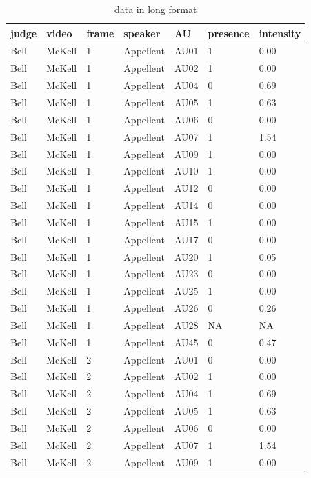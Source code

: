 \documentclass{monashthesis}
\begin{document}
\begin{table}[ht]
\begin{center}
\caption{\label{tab:long} data in long format}
\begin{tabular}{lllllll}
\toprule
judge & video & frame & speaker & AU & presence & intensity \\
\midrule
Bell & McKell & 1 & Appellent & AU01 &  1 & 0.00 \\
Bell & McKell & 1 & Appellent & AU02 &  1 & 0.00 \\
Bell & McKell & 1 & Appellent & AU04 &  0 & 0.69 \\
Bell & McKell & 1 & Appellent & AU05 &  1 & 0.63 \\
Bell & McKell & 1 & Appellent & AU06 &  0 & 0.00 \\
Bell & McKell & 1 & Appellent & AU07 &  1 & 1.54 \\
Bell & McKell & 1 & Appellent & AU09 &  1 & 0.00 \\
Bell & McKell & 1 & Appellent & AU10 &  1 & 0.00 \\
Bell & McKell & 1 & Appellent & AU12 &  0 & 0.00 \\
Bell & McKell & 1 & Appellent & AU14 &  0 & 0.00 \\
Bell & McKell & 1 & Appellent & AU15 &  1 & 0.00 \\
Bell & McKell & 1 & Appellent & AU17 &  0 & 0.00 \\
Bell & McKell & 1 & Appellent & AU20 &  1 & 0.05 \\
Bell & McKell & 1 & Appellent & AU23 &  0 & 0.00 \\
Bell & McKell & 1 & Appellent & AU25 &  1 & 0.00 \\
Bell & McKell & 1 & Appellent & AU26 &  0 & 0.26 \\
Bell & McKell & 1 & Appellent & AU28 & NA &   NA \\
Bell & McKell & 1 & Appellent & AU45 &  0 & 0.47 \\
Bell & McKell & 2 & Appellent & AU01 &  0 & 0.00 \\
Bell & McKell & 2 & Appellent & AU02 &  1 & 0.00 \\
Bell & McKell & 2 & Appellent & AU04 &  1 & 0.69 \\
Bell & McKell & 2 & Appellent & AU05 &  1 & 0.63 \\
Bell & McKell & 2 & Appellent & AU06 &  0 & 0.00 \\
Bell & McKell & 2 & Appellent & AU07 &  1 & 1.54 \\
Bell & McKell & 2 & Appellent & AU09 &  1 & 0.00 \\

\end{tabular}
\end{center}
\end{table}
\end{document}
